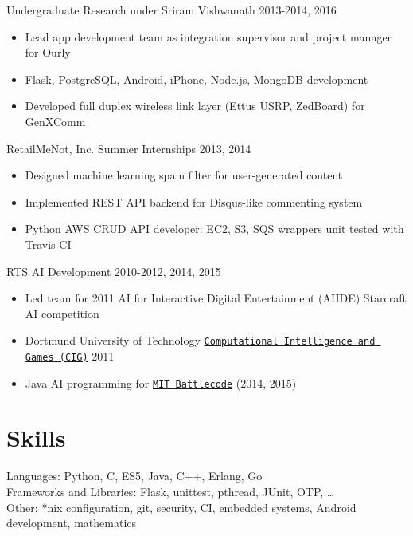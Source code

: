 \documentclass[line,margin]{res}
\begin{document}
\begin{resume}
    \vspace{-8pt}
    Undergraduate Research under Sriram Vishwanath
    \hfill  2013-2014, 2016
        \begin{itemize} \itemsep -2pt
        \item Lead app development team as integration supervisor and project manager for Ourly
        \item Flask, PostgreSQL, Android, iPhone, Node.js, MongoDB development
        \item Developed full duplex wireless link layer (Ettus USRP, ZedBoard) for GenXComm
        \end{itemize}

    \vspace{-8pt}
    RetailMeNot, Inc. Summer Internships
    \hfill  2013, 2014
        \begin{itemize} \itemsep -2pt
        \item Designed machine learning spam filter for user-generated content
        \item Implemented REST API backend for Disqus-like commenting system
        \item Python AWS CRUD API developer: EC2, S3, SQS wrappers unit tested with Travis CI
        \end{itemize}

    \vspace{-8pt}
    RTS AI Development
    \hfill  2010-2012, 2014, 2015
        \begin{itemize} \itemsep -2pt
        \item Led team for 2011 AI for Interactive Digital Entertainment (AIIDE) Starcraft AI competition  
        \item Dortmund University of Technology \href{https://www.s11-www.cs.uni-dortmund.de/rts-competition/starcraft-cig2011}{\texttt{Computational Intelligence and Games (CIG)}} 2011
        \item Java AI programming for \href{http://www.battlecode.org/}{\texttt{MIT Battlecode}} (2014, 2015)
        \end{itemize}


\vspace{-8pt}
\section{Skills}
    \vspace{12pt} 
    Languages: Python, C, ES5, Java, C++, Erlang, Go \\ 
    Frameworks and Libraries: Flask, unittest, pthread, JUnit, OTP, \ldots \\
    Other: *nix configuration, git, security, CI, embedded systems, Android development, mathematics



\end{resume}
\end{document}
